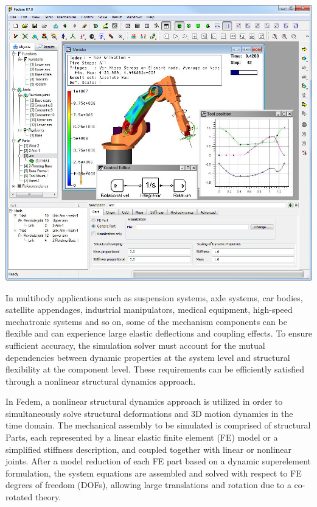 \medskip\noindent
\includegraphics[width=\textwidth]{Figures/1-introduction}



In multibody applications such as suspension systems, axle systems,
car bodies, satellite appendages, industrial manipulators, medical
equipment, high-speed mechatronic systems and so on, some of the
mechanism components can be flexible and can experience large
elastic deflections and coupling effects. To ensure sufficient
accuracy, the simulation solver must account for the mutual
dependencies between dynamic properties at the system level and
structural flexibility at the component level. These requirements
can be efficiently satisfied through a nonlinear structural
dynamics approach.

In Fedem, a nonlinear structural dynamics approach is utilized
in order to simultaneously solve structural deformations and
3D motion dynamics in the time domain. The mechanical assembly
to be simulated is comprised of structural Parts, each
represented by a linear elastic finite element (FE) model
or a simplified stiffness description, and coupled together
with linear or nonlinear joints. After a model reduction of
each FE part based on a dynamic superelement formulation, the
system equations are assembled and solved with respect to FE
degrees of freedom (DOFs), allowing large translations and
rotation due to a co-rotated theory.


